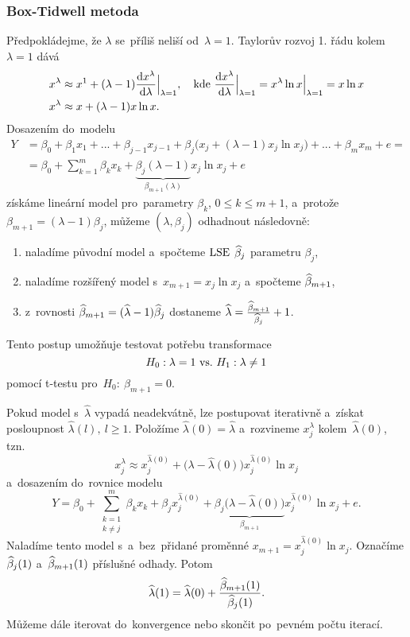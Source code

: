 \subsubsection{Box-Tidwell metoda}
Předpokládejme, že $\lambda$ se~příliš neliší od~$\lambda = 1$. Taylorův rozvoj 1. řádu kolem~$\lambda = 1$ dává
\begin{align*}
x^\lambda & \approx x^1+(\lambda-1)\frac{\mathrm{d} x^\lambda}{\mathrm{d} \lambda}\Big|_{\lambda = 1}, \quad \text{kde } \frac{\mathrm{d} x^\lambda}{\mathrm{d} \lambda}\Big|_{\lambda = 1} = x^\lambda \ln x \Big|_{\lambda = 1} = x\ln x \\
x^\lambda & \approx x+(\lambda-1)x\ln x.
\end{align*}
Dosazením do~modelu
\begin{align*}
	Y & = \beta_0+\beta_1 x_1+...+\beta_{j-1}x_{j-1}+\beta_j\big(x_j+(\lambda-1)x_j\ln x_j\big)+...+\beta_m x_m+e = \\
	& = \beta_0+\sum_{k = 1}^m \beta_k x_k+\underbrace{\beta_j(\lambda-1)}_{\beta_{m+1}(\lambda)}x_j\ln x_j+e
\end{align*}
získáme lineární model pro~parametry $\beta_k$, $0\leq k\leq m+1$, a~protože $\beta_{m+1} = (\lambda-1)\beta_j$, můžeme $(\lambda,\beta_j)$ odhadnout následovně:
\begin{enumerate}[1)]
	\item naladíme původní model a~spočteme $\mathrm{LSE}$ $\widehat{\beta}_j$ parametru $\beta_j$,
	\item naladíme rozšířený model s~$x_{m+1} = x_j\ln x_j$ a~spočteme $\widehat{\beta}_{m+1}$,
	\item z~rovnosti $\widehat{\beta}_{m+1} = (\widehat{\lambda}-1)\widehat{\beta}_j$ dostaneme $\widehat{\lambda} = \frac{\widehat{\beta}_{m+1}}{\widehat{\beta}_j}+1$.
\end{enumerate}
Tento postup umožňuje testovat potřebu transformace
 $$ H_0: \lambda = 1 ~\text{vs.}~ H_1: \lambda\neq1 $$
pomocí t-testu pro~$H_0:~\beta_{m+1} = 0$.

\begin{remark}
Pokud model s~$\widehat{\lambda}$ vypadá neadekvátně, lze postupovat iterativně a~získat posloupnost $\widehat{\lambda}(l),~l\geq1$. Položíme $\widehat{\lambda}(0) = \widehat{\lambda}$ a~rozvineme $x_j^\lambda$ kolem~$\widehat{\lambda}(0)$, tzn. $$x_j^\lambda\approx x_j^{\widehat{\lambda}(0)}+\big(\lambda-\widehat{\lambda}(0)\big)x_j^{\widehat{\lambda}(0)}\ln x_j$$ a~dosazením do~rovnice modelu
 $$
Y = \beta_0 + \sum_{\substack{k = 1 \\ k\neq j}}^m \beta_k x_k+\beta_j x_j^{\widehat{\lambda}(0)}+\underbrace{\beta_j\big(\lambda-\widehat{\lambda}(0)\big)}_{\beta_{m+1}}x_j^{\widehat{\lambda}(0)}\ln x_j+e.
 $$
Naladíme tento model s~a~bez~přidané proměnné $x_{m+1} = x_j^{\widehat{\lambda}(0)}\ln x_j$. Označíme $\widehat{\beta}_j(1)$ a~$\widehat{\beta}_{m+1}(1)$ příslušné odhady. Potom
 $$
\widehat{\lambda}(1) = \widehat{\lambda}(0)+\frac{\widehat{\beta}_{m+1}(1)}{\widehat{\beta}_j(1)}.
 $$
Můžeme dále iterovat do~konvergence nebo skončit po~pevném počtu iterací.
\end{remark}

